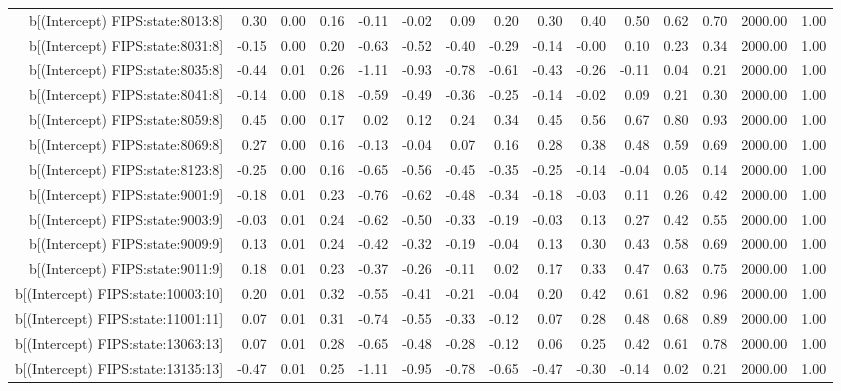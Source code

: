 \begin{table}[ht]
\begin{tabular}{rrrrrrrrrrrrrrr}
  b[(Intercept) FIPS:state:8013:8] & 0.30 & 0.00 & 0.16 & -0.11 & -0.02 & 0.09 & 0.20 & 0.30 & 0.40 & 0.50 & 0.62 & 0.70 & 2000.00 & 1.00 \\ 
  b[(Intercept) FIPS:state:8031:8] & -0.15 & 0.00 & 0.20 & -0.63 & -0.52 & -0.40 & -0.29 & -0.14 & -0.00 & 0.10 & 0.23 & 0.34 & 2000.00 & 1.00 \\ 
  b[(Intercept) FIPS:state:8035:8] & -0.44 & 0.01 & 0.26 & -1.11 & -0.93 & -0.78 & -0.61 & -0.43 & -0.26 & -0.11 & 0.04 & 0.21 & 2000.00 & 1.00 \\ 
  b[(Intercept) FIPS:state:8041:8] & -0.14 & 0.00 & 0.18 & -0.59 & -0.49 & -0.36 & -0.25 & -0.14 & -0.02 & 0.09 & 0.21 & 0.30 & 2000.00 & 1.00 \\ 
  b[(Intercept) FIPS:state:8059:8] & 0.45 & 0.00 & 0.17 & 0.02 & 0.12 & 0.24 & 0.34 & 0.45 & 0.56 & 0.67 & 0.80 & 0.93 & 2000.00 & 1.00 \\ 
  b[(Intercept) FIPS:state:8069:8] & 0.27 & 0.00 & 0.16 & -0.13 & -0.04 & 0.07 & 0.16 & 0.28 & 0.38 & 0.48 & 0.59 & 0.69 & 2000.00 & 1.00 \\ 
  b[(Intercept) FIPS:state:8123:8] & -0.25 & 0.00 & 0.16 & -0.65 & -0.56 & -0.45 & -0.35 & -0.25 & -0.14 & -0.04 & 0.05 & 0.14 & 2000.00 & 1.00 \\ 
  b[(Intercept) FIPS:state:9001:9] & -0.18 & 0.01 & 0.23 & -0.76 & -0.62 & -0.48 & -0.34 & -0.18 & -0.03 & 0.11 & 0.26 & 0.42 & 2000.00 & 1.00 \\ 
  b[(Intercept) FIPS:state:9003:9] & -0.03 & 0.01 & 0.24 & -0.62 & -0.50 & -0.33 & -0.19 & -0.03 & 0.13 & 0.27 & 0.42 & 0.55 & 2000.00 & 1.00 \\ 
  b[(Intercept) FIPS:state:9009:9] & 0.13 & 0.01 & 0.24 & -0.42 & -0.32 & -0.19 & -0.04 & 0.13 & 0.30 & 0.43 & 0.58 & 0.69 & 2000.00 & 1.00 \\ 
  b[(Intercept) FIPS:state:9011:9] & 0.18 & 0.01 & 0.23 & -0.37 & -0.26 & -0.11 & 0.02 & 0.17 & 0.33 & 0.47 & 0.63 & 0.75 & 2000.00 & 1.00 \\ 
  b[(Intercept) FIPS:state:10003:10] & 0.20 & 0.01 & 0.32 & -0.55 & -0.41 & -0.21 & -0.04 & 0.20 & 0.42 & 0.61 & 0.82 & 0.96 & 2000.00 & 1.00 \\ 
  b[(Intercept) FIPS:state:11001:11] & 0.07 & 0.01 & 0.31 & -0.74 & -0.55 & -0.33 & -0.12 & 0.07 & 0.28 & 0.48 & 0.68 & 0.89 & 2000.00 & 1.00 \\ 
  b[(Intercept) FIPS:state:13063:13] & 0.07 & 0.01 & 0.28 & -0.65 & -0.48 & -0.28 & -0.12 & 0.06 & 0.25 & 0.42 & 0.61 & 0.78 & 2000.00 & 1.00 \\ 
  b[(Intercept) FIPS:state:13135:13] & -0.47 & 0.01 & 0.25 & -1.11 & -0.95 & -0.78 & -0.65 & -0.47 & -0.30 & -0.14 & 0.02 & 0.21 & 2000.00 & 1.00 \\ 

\end{tabular}
\end{table}
